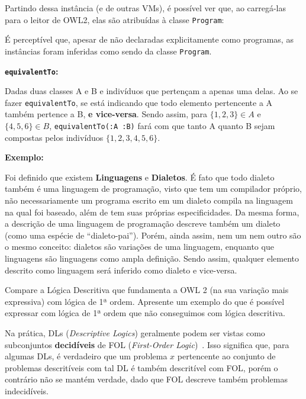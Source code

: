 \documentclass[answers]{exam}
\newcommand{\result}[2]{\textfile[firstline=#1, lastline=#2]{thesampleoutput}}
\begin{document}
\begin{questions}
\begin{answer}
            Partindo dessa instância (e de outras VMs), é possível ver que, ao
            carregá-las para o leitor de OWL2, elas são atribuídas à classe
            \texttt{Program}:

            \result{15}{17}

            É perceptível que, apesar de não declaradas explicitamente como
            programas, as instâncias foram inferidas como sendo da classe
            \texttt{Program}.

            \textbf{\texttt{equivalentTo}:}

            Dadas duas classes A e B e indivíduos que pertençam a apenas uma
            delas. Ao se fazer \texttt{equivalentTo}, se está indicando que
            todo elemento pertencente a A também pertence a B, \textbf{e
            vice-versa}.  Sendo assim, para $\{1, 2, 3\} \in A$ e $\{4, 5, 6\}
            \in B$, \texttt{equivalentTo(:A :B)} fará com que tanto A quanto B
            sejam compostas pelos indivíduos $\{1, 2, 3, 4, 5, 6\}$.

            \textbf{Exemplo:}

            Foi definido que existem \textbf{Linguagens} e \textbf{Dialetos}. É
            fato que todo dialeto também é uma linguagem de programação, visto
            que tem um compilador próprio, não necessariamente um programa
            escrito em um dialeto compila na linguagem na qual foi baseado,
            além de tem suas próprias especificidades. Da mesma forma, a
            descrição de uma linguagem de programação descreve também um
            dialeto (como uma espécie de ``dialeto-pai''). Porém, ainda assim,
            nem um nem outro são o mesmo conceito: dialetos são variações de
            uma linguagem, enquanto que linguagens são linguagens como ampla
            definição.  Sendo assim, qualquer elemento descrito como linguagem
            será inferido como dialeto e vice-versa.
        \end{answer}

        \question{}
        Compare a Lógica Descritiva que fundamenta a OWL 2 (na sua variação
        mais expressiva) com lógica de 1ª ordem. Apresente um exemplo do que é
        possível expressar com lógica de 1ª ordem que não conseguimos com
        lógica descritiva.

        \begin{answer}
            Na prática, DLs (\textit{Descriptive Logics}) geralmente podem ser
            vistas como subconjuntos \textbf{decidíveis} de FOL
            (\textit{First-Order Logic})~\cite{tsarkov:2003}. Isso significa
            que, para algumas DLs, é verdadeiro que um problema $x$ pertencente
            ao conjunto de problemas descritíveis com tal DL é também
            descritível com FOL, porém o contrário não se mantém verdade, dado
            que FOL descreve também problemas indecidíveis.


\end{answer}
\end{questions}
\end{document}
